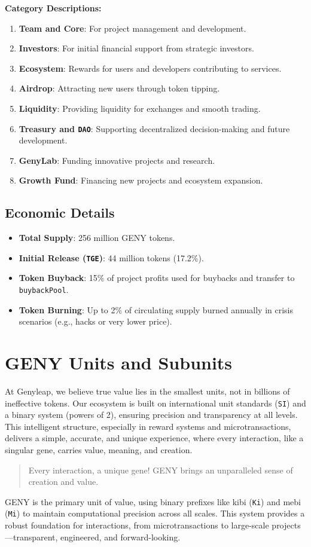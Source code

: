 \documentclass[a4paper,12pt,openany]{book}
\begin{document}
\textbf{Category Descriptions:}
\begin{enumerate}
    \item \textbf{Team and Core}: For project management and development.
    \item \textbf{Investors}: For initial financial support from strategic investors.
    \item \textbf{Ecosystem}: Rewards for users and developers contributing to services.
    \item \textbf{Airdrop}: Attracting new users through token tipping.
    \item \textbf{Liquidity}: Providing liquidity for exchanges and smooth trading.
    \item \textbf{Treasury and \texttt{DAO}}: Supporting decentralized decision-making and future development.
    \item \textbf{GenyLab}: Funding innovative projects and research.
    \item \textbf{Growth Fund}: Financing new projects and ecosystem expansion.
\end{enumerate}

\subsection*{Economic Details}
\begin{itemize}
    \item \textbf{Total Supply}: 256 million GENY tokens.
    \item \textbf{Initial Release (\texttt{TGE})}: 44 million tokens (17.2\%).
    \item \textbf{Token Buyback}: 15\% of project profits used for buybacks and transfer to \texttt{buybackPool}.
    \item \textbf{Token Burning}: Up to 2\% of circulating supply burned annually in crisis scenarios (e.g., hacks or very lower price).
\end{itemize}
\newpage

\section*{GENY Units and Subunits}
At Genyleap, we believe true value lies in the smallest units, not in billions of ineffective tokens. Our ecosystem is built on international unit standards (\texttt{SI}) and a binary system (powers of 2), ensuring precision and transparency at all levels. This intelligent structure, especially in reward systems and microtransactions, delivers a simple, accurate, and unique experience, where every interaction, like a singular gene, carries value, meaning, and creation.
\begin{quote}
Every interaction, a unique gene! GENY brings an unparalleled sense of creation and value.
\end{quote}
GENY is the primary unit of value, using binary prefixes like kibi (\texttt{Ki}) and mebi (\texttt{Mi}) to maintain computational precision across all scales. This system provides a robust foundation for interactions, from microtransactions to large-scale projects—transparent, engineered, and forward-looking.
\end{document}

